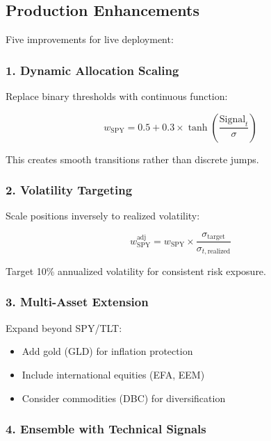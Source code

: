 \documentclass[12pt,a4paper]{article}
\begin{document}
\subsection{Production Enhancements}

Five improvements for live deployment:

\subsubsection{1. Dynamic Allocation Scaling}

Replace binary thresholds with continuous function:

\begin{equation}
w_{\text{SPY}} = 0.5 + 0.3 \times \tanh\left(\frac{\text{Signal}_t}{\sigma}\right)
\end{equation}

This creates smooth transitions rather than discrete jumps.

\subsubsection{2. Volatility Targeting}

Scale positions inversely to realized volatility:

\begin{equation}
w_{\text{SPY}}^{\text{adj}} = w_{\text{SPY}} \times \frac{\sigma_{\text{target}}}{\sigma_{t,\text{realized}}}
\end{equation}

Target 10\% annualized volatility for consistent risk exposure.

\subsubsection{3. Multi-Asset Extension}

Expand beyond SPY/TLT:
\begin{itemize}
    \item Add gold (GLD) for inflation protection
    \item Include international equities (EFA, EEM)
    \item Consider commodities (DBC) for diversification
\end{itemize}

\subsubsection{4. Ensemble with Technical Signals}
\end{document}

